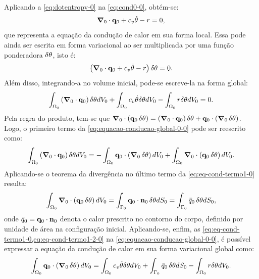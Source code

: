 \documentclass[Tese.tex]{subfiles}
\begin{document}
Aplicando a \cref{eq:dotentropy-0} na \cref{eq:cond0-0}, obtém-se:
\begin{equation}\label{eq:equacao-conducao-local-0}
\boldsymbol{\nabla}_0\cdot\mathbf{q}_0 + c_v\dot{\theta} - r = 0,
\end{equation}
que representa a equação da condução de calor em sua forma local. Essa pode ainda ser escrita em forma variacional ao ser multiplicada por uma função ponderadora $\delta\theta$, isto é:
\begin{equation}\label{eq:equacao-conducao-variacional-0}
\left(\boldsymbol{\nabla}_0\cdot\mathbf{q}_0 + c_v\dot{\theta} - r\right)\delta\theta = 0.
\end{equation}
Além disso, integrando-a no volume inicial, pode-se escreve-la na forma global:
\begin{equation}\label{eq:equacao-conducao-global-0-0}
\int_{\Omega_0}\left(\boldsymbol{\nabla}_0\cdot\mathbf{q}_0\right)\delta\theta dV_0 + \int_{\Omega_0}c_v\dot{\theta}\delta\theta dV_0 - \int_{\Omega_0} r\delta\theta dV_0 = 0.
\end{equation}
Pela regra do produto, tem-se que $\boldsymbol{\nabla}_0\cdot\left(\mathbf{q}_0\,\delta\theta\right) = \left(\boldsymbol{\nabla}_0\cdot\mathbf{q}_0\right)\delta\theta + \mathbf{q}_0\cdot\left(\boldsymbol{\nabla}_0\,\delta\theta\right)$. Logo, o primeiro termo da \cref{eq:equacao-conducao-global-0-0} pode ser reescrito como:
\begin{equation}\label{eq:eq-cond-termo1-0}
\int_{\Omega_0}\left(\boldsymbol{\nabla}_0\cdot\mathbf{q}_0\right)\delta\theta dV_0 = - \int_{\Omega_0}\mathbf{q}_0\cdot\left(\boldsymbol{\nabla}_0\,\delta\theta\right) dV_0 + \int_{\Omega_0}\boldsymbol{\nabla}_0\cdot\left(\mathbf{q}_0\,\delta\theta\right) dV_0.
\end{equation}
Aplicando-se o teorema da divergência no último termo da \cref{eq:eq-cond-termo1-0} resulta:
\begin{equation}\label{eq:eq-cond-termo1-2-0}
\int_{\Omega_0}\boldsymbol{\nabla}_0\cdot\left(\mathbf{q}_0\,\delta\theta\right) dV_0 = \int_{\Gamma_0}\mathbf{q}_0\cdot\mathbf{n}_0\,\delta\theta dS_0 = \int_{\Gamma_0}\bar{q}_0\,\delta\theta dS_0,
\end{equation}
onde $\bar{q}_0 = \mathbf{q}_0\cdot\mathbf{n}_0$ denota o calor prescrito no contorno do corpo, definido por unidade de área na configuração inicial. Aplicando-se, enfim, as \cref{eq:eq-cond-termo1-0,eq:eq-cond-termo1-2-0} na \cref{eq:equacao-conducao-global-0-0}, é possível expressar a equação da condução de calor em sua forma variacional global como:
\begin{equation}\label{eq:equacao-conducao-global-02}
\int_{\Omega_0}\mathbf{q}_0\cdot\left(\boldsymbol{\nabla}_0\,\delta\theta\right) dV_0 = \int_{\Omega_0}c_v\dot{\theta}\delta\theta dV_0 + \int_{\Gamma_0}\bar{q}_0\,\delta\theta dS_0 - \int_{\Omega_0}r\delta\theta dV_0.
\end{equation}
\end{document}
